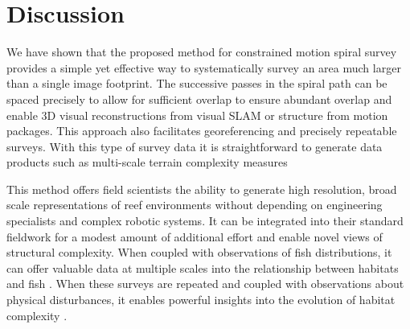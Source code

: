 \section{Discussion}
We have shown that the proposed method for constrained motion spiral survey provides a simple yet effective way to systematically survey an area much larger than a single image footprint. The successive passes in the spiral path can be spaced precisely to allow for sufficient overlap to ensure abundant overlap and enable 3D visual reconstructions from visual SLAM or structure from motion packages. This approach also facilitates georeferencing and precisely repeatable surveys. With this type of survey data it is straightforward to generate data products such as multi-scale terrain complexity measures \cite{Friedman_2012}

This method offers field scientists the ability to generate high resolution, broad scale representations of reef environments without depending on engineering specialists and complex robotic systems. It can be integrated into their standard fieldwork for a modest amount of additional effort and enable novel views of structural complexity. When coupled with observations of fish distributions, it can offer valuable data at multiple scales into the relationship between habitats and fish \cite{josh?}. When these surveys are repeated and coupled with observations about physical disturbances, it enables powerful insights into the evolution of habitat complexity \cite{josh?}.


